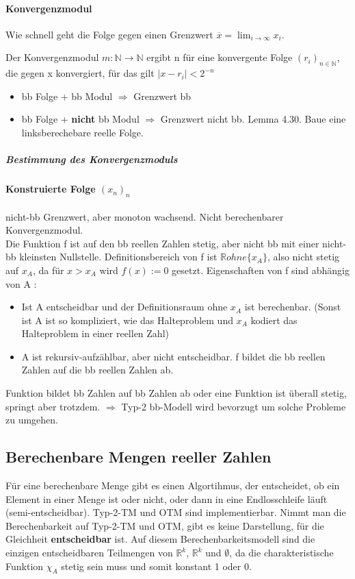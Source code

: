 \documentclass[ngerman]{scrartcl}
\begin{document}
\paragraph{Konvergenzmodul}
Wie schnell geht die Folge gegen einen Grenzwert $ \overline{x} = \lim_{i \rightarrow \infty} x_ i $.

Der Konvergenzmodul $ m : \mathbb{N} \rightarrow \mathbb{N} $ ergibt n für eine konvergente Folge $ (r_i)_{n \in \mathbb {N}}$, die gegen x konvergiert, für das gilt $ |x - r_i| < 2^{-n} $
\begin{itemize}
  \item bb Folge + bb Modul $ \Rightarrow $ Grenzwert bb
  \item bb Folge + \textbf{nicht} bb Modul $ \Rightarrow $ Grenzwert nicht bb. Lemma 4.30. Baue eine linksberechebare reelle Folge.
\end{itemize}

\subparagraph{Bestimmung des Konvergenzmoduls}

\paragraph{Konstruierte Folge $ (x_n)_n $} nicht-bb Grenzwert, aber monoton wachsend. Nicht berechenbarer Konvergenzmodul. \\
Die Funktion f ist auf den bb reellen Zahlen stetig, aber nicht bb mit einer nicht-bb kleinsten Nullstelle. Definitionsbereich von f ist $ \mathbb{R} ohne \{x_A \} $, also nicht stetig auf $ x_A $, da für $ x > x_A$ wird $ f(x) := 0$ gesetzt. Eigenschaften von f sind abhängig von A :
\begin{itemize}
  \item Ist A entscheidbar und der Definitionsraum ohne $ x_A $ ist berechenbar. (Sonst ist A ist so kompliziert, wie das Halteproblem und $ x_A $ kodiert das Halteproblem in einer reellen Zahl)
  \item A ist rekursiv-aufzählbar, aber nicht entscheidbar. f bildet die bb reellen Zahlen auf die bb reellen Zahlen ab.
\end{itemize}
Funktion bildet bb Zahlen auf bb Zahlen ab oder eine Funktion ist überall stetig, springt aber trotzdem. $ \Rightarrow $ Typ-2 bb-Modell wird bevorzugt um solche Probleme zu umgehen.

\subsection{Berechenbare Mengen reeller Zahlen}
Für eine berechenbare Menge gibt es einen Algortihmus, der entscheidet, ob ein Element in einer Menge ist oder nicht, oder dann in eine Endlosschleife läuft (semi-entscheidbar). Typ-2-TM und OTM sind implementierbar. Nimmt man die Berechenbarkeit auf Typ-2-TM und OTM, gibt es keine Darstellung, für die Gleichheit \textbf{entscheidbar} ist. Auf diesem Berechenbarkeitsmodell sind die einzigen entscheidbaren Teilmengen von $ \mathbb{R}^k $, $ \mathbb{R}^k $ und $ \emptyset $, da die charakteristische Funktion $ \chi_A $ stetig sein muss und somit konstant 1 oder 0.
\end{document}

